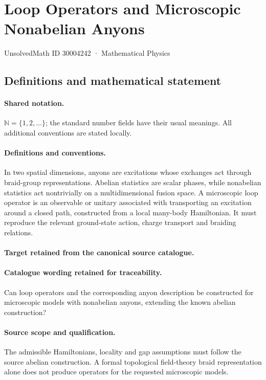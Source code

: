 \documentclass[11pt]{article}
\begin{document}
\setcounter{section}{30004241}
\section{Loop Operators and Microscopic Nonabelian Anyons}\label{30004242}
{\small UnsolvedMath ID 30004242 · Mathematical Physics}
\subsection{Definitions and mathematical statement}

\paragraph{Shared notation.}$\mathbb N=\{1,2,\ldots\}$; the standard number fields have their usual meanings. All additional conventions are stated locally.


\paragraph{Definitions and conventions.}
In two spatial dimensions, anyons are excitations whose exchanges act through braid-group representations. Abelian statistics are scalar phases, while nonabelian statistics act nontrivially on a multidimensional fusion space. A microscopic loop operator is an observable or unitary associated with transporting an excitation around a closed path, constructed from a local many-body Hamiltonian. It must reproduce the relevant ground-state action, charge transport and braiding relations.

\paragraph{Target retained from the canonical source catalogue.}
\paragraph{Catalogue wording retained for traceability.}
Can loop operators and the corresponding anyon description be constructed for microscopic models with nonabelian anyons, extending the known abelian construction?

\paragraph{Source scope and qualification.}
The admissible Hamiltonians, locality and gap assumptions must follow the source abelian construction. A formal topological field-theory braid representation alone does not produce operators for the requested microscopic models.
\end{document}
